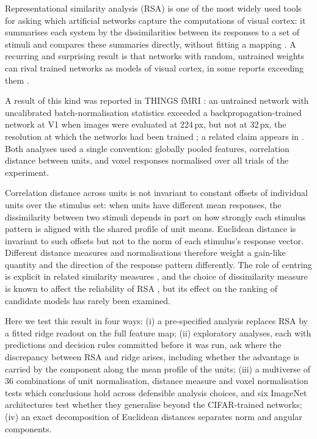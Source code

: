 Representational similarity analysis (RSA) is one of the most widely used tools for asking
which artificial networks capture the computations of visual cortex: it summarises each
system by the dissimilarities between its responses to a set of stimuli and compares
these summaries directly, without fitting a mapping \citep{kriegeskorte2008}. A
recurring and surprising result is that networks with random, untrained weights can
rival trained networks as models of visual cortex, in some reports exceeding them
\citep{truzzi2020, kazemian2025}.

A result of this kind was reported in THINGS fMRI \citep{hebart2023}:
an untrained network with uncalibrated batch-normalisation statistics exceeded a
backpropagation-trained network at V1 when images were evaluated at 224\,px, but not at
32\,px, the resolution at which the networks had been trained \citep{evalres}; a related
claim appears in \citet{lrrsa}. Both analyses used a single convention:
globally pooled features, correlation distance between units, and voxel responses
normalised over all trials of the experiment.

Correlation distance across
units is not invariant to constant offsets of individual units over the stimulus set:
when units have different mean responses, the dissimilarity between two stimuli depends
in part on how strongly each stimulus pattern is aligned with the shared profile of unit means. Euclidean distance is invariant to such offsets but not to the norm of
each stimulus's response vector. Different distance measures and normalisations
therefore weight a gain-like quantity and the direction of the response pattern
differently. The role of centring is explicit in related similarity measures
\citep{kornblith2019}, and the choice of dissimilarity measure is known to affect
the reliability of RSA \citep{walther2016, diedrichsen2017}, but its effect on
the ranking of candidate models has rarely been examined.

Here we test this result in four ways: (i) a pre-specified analysis replaces RSA by a fitted
ridge readout on the full feature map; (ii) exploratory analyses, each with predictions and
decision rules committed before it was run, ask where the discrepancy between RSA and ridge
arises, including whether the advantage is carried by the component along the mean profile of
the units; (iii) a multiverse of 36 combinations of unit normalisation, distance measure and
voxel normalisation \citep{steegen2016} tests which conclusions hold across defensible analysis
choices, and six ImageNet architectures test whether they generalise beyond the CIFAR-trained
networks; (iv) an exact decomposition of Euclidean distances separates norm and angular
components.

